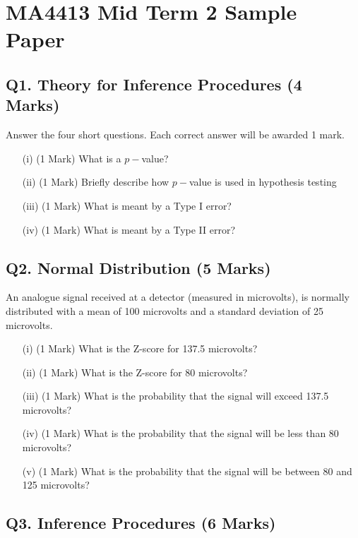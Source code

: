 \documentclass[]{article}
\title{}
\author{}
\begin{document}
\section*{MA4413 Mid Term 2 Sample Paper}

\subsection*{Q1. Theory for Inference Procedures (4 Marks)}
Answer the four short questions. Each correct answer will be awarded 1 mark.
\begin{itemize}
\item[(i)] (1 Mark) What is a $p-$value?
\item[(ii)] (1 Mark) Briefly describe how $p-$value is used in hypothesis testing
\item[(iii)] (1 Mark) What is meant by a Type I error?
\item[(iv)] (1 Mark) What is meant by a Type II error?
\end{itemize}

\subsection*{Q2. Normal Distribution (5 Marks)}
An analogue signal received at a detector (measured in microvolts), is normally distributed with a mean of 100 microvolts 
and a standard deviation of 25 microvolts.

\begin{itemize}
\item[(i)] (1 Mark) What is the Z-score for 137.5 microvolts? 
\item[(ii)] (1 Mark) What is the Z-score for 80 microvolts?
\item[(iii)] (1 Mark) What is the probability that the signal will exceed 137.5 microvolts? 
\item[(iv)](1 Mark) What is the probability that the signal will be less than 80 microvolts?
\item[(v)] (1 Mark) What is the probability that the signal will be between 80 and 125 microvolts?
\end{itemize}


\newpage
\subsection*{Q3. Inference Procedures (6 Marks)}
\end{document}
